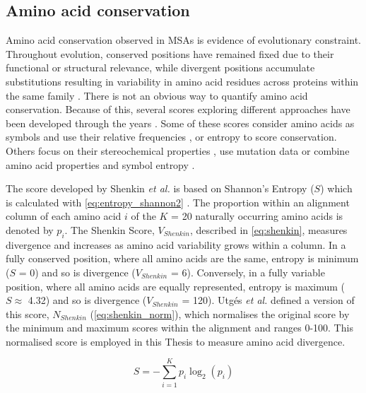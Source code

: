 \subsection{Amino acid conservation}

Amino acid conservation observed in MSAs is evidence of evolutionary constraint. Throughout evolution, conserved positions have remained fixed due to their functional or structural relevance, while divergent positions accumulate substitutions resulting in variability in amino acid residues across proteins within the same family \cite{ZUCKERKANDL_1965_DIVERGENCE}. There is not an obvious way to quantify amino acid conservation. Because of this, several scores exploring different approaches have been developed through the years \cite{VALDAR_2002_SCORES}. Some of these scores consider amino acids as symbols and use their relative frequencies \cite{WU_1970_SCORE, JORES_1990_SCORE, LOCKLESS_1999_SCORE}, or entropy \cite{SANDER_1991_SCORE, SHENKIN_1991_SCORE, GERSTEIN_1995_SCORE} to score conservation. Others focus on their stereochemical properties \cite{TAYLOR_1986_PROPERTIES, ZVELEBIL_1987_PREDICTION}, use mutation data \cite{KARLIN_1996_SCORE, THOMPSON_1997_SCORE, LANDGRAF_1999_SCORE, PILPEL_1999_SCORE, ARMON_2001_SCORE, VALDAR_2001_SCORE} or combine amino acid properties and symbol entropy \cite{WILLIAMSON_1995_SCORE, MIRNY_1999_SCORE}.

The score developed by Shenkin \textit{et al.} \cite{SHENKIN_1991_SCORE} is based on Shannon's Entropy ($S$) which is calculated with \autoref{eq:entropy_shannon2} \cite{SHANNON_1948_ENTROPY}. The proportion within an alignment column of each amino acid $i$ of the $K$ = 20 naturally occurring amino acids is denoted by $p_i$. The Shenkin Score, $V_{Shenkin}$, described in \autoref{eq:shenkin}, measures divergence and increases as amino acid variability grows within a column. In a fully conserved position, where all amino acids are the same, entropy is minimum ($S$ = 0) and so is divergence ($V_{Shenkin}$ = 6). Conversely, in a fully variable position, where all amino acids are equally represented, entropy is maximum ($S \approx$ 4.32) and so is divergence ($V_{Shenkin}$ = 120). Utgés \textit{et al.} \cite{UTGES_2021_ANKS} defined a version of this score, $N_{Shenkin}$ (\autoref{eq:shenkin_norm}), which normalises the original score by the minimum and maximum scores within the alignment and ranges 0-100. This normalised score is employed in this Thesis to measure amino acid divergence.

\begin{equation}
S = - \sum_{i=1}^{K} p_i \log_2(p_i)
\label{eq:entropy_shannon2}
\end{equation}

